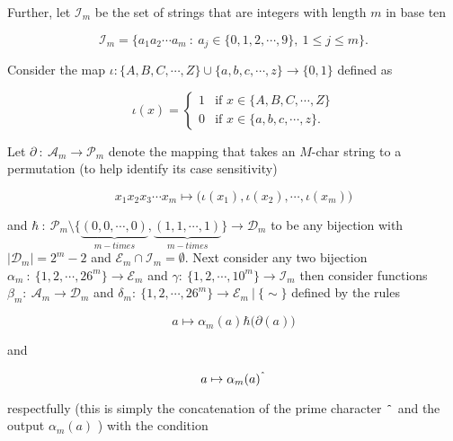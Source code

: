\documentclass[amsmath,12pt,a4paper]{amsart}
\begin{document}
Further, let $\mathcal{I}_m$ be the set of strings that are integers with length $m$ in base ten

\begin{equation}\label{Eq7}
\mathcal{I}_m  =\biggl\{a_1a_2\cdots a_m~:~ a_j\in \{0,1,2,\cdots,9\},~1\le j\le m\biggr\}.
\end{equation}

Consider the map $\iota: \{A,B,C,\cdots,Z\}\cup \{a,b,c,\cdots,z\}\rightarrow \{0,1\}$ defined as 


\begin{equation}\label{Eq8}
\iota(x) = \begin{cases}
1 & \text{if $x\in \{A,B,C,\cdots,Z\}$}\\
0 & \text{if $x\in \{a,b,c,\cdots, z\}$}.
\end{cases}
\end{equation}

Let $\partial ~:~\mathcal{A}_m\rightarrow \mathcal{P}_m$ denote the mapping that takes an $M$-char string to a permutation (to help identify its case sensitivity)


\begin{equation}\label{Eq9}
x_1x_2x_3\cdots x_m\mapsto \biggl(\iota(x_1),\iota(x_2),\cdots, \iota(x_m)\biggr)
\end{equation}

and $\hbar~:~ \mathcal{P}_m \setminus \biggl\{\underbrace{(0,0,\cdots,0)}_{m-times}, \underbrace{(1,1,\cdots,1)}_{m-times}\biggr\}\rightarrow \mathcal{D}_m$ to be any bijection with $|\mathcal{D}_m|= 2^m-2$ and $\mathcal{E}_m \cap \mathcal{I}_m = \emptyset$. Next consider any two bijection $\alpha_m~:~ \{1,2,\cdots, 26^m\}\rightarrow \mathcal{E}_m$ and $\gamma:~\{1,2,\cdots, 10^m\}\rightarrow \mathcal{I}_m$ then consider functions $\beta_m:~\mathcal{A}_m \rightarrow \mathcal{D}_m$ and $\delta_m:~\{1,2,\cdots, 26^m\}\rightarrow \mathcal{E}_m ~\vert ~ \{\sim\}$ defined by the rules 
 
 \begin{equation}\label{Eq10} 
a\mapsto \alpha_m(a) \hbar\biggl(\partial(a)\biggl)
 \end{equation}
 
 and 
 
 \begin{equation}\label{Eq11}
 a \mapsto \alpha_m(a)^{\texttt{\^{}}}
 \end{equation}
 
 respectfully (this is simply the concatenation of the prime character $\texttt{\^{}}$ and the output $\alpha_m(a)$ ) with the condition 
 
\end{document}
